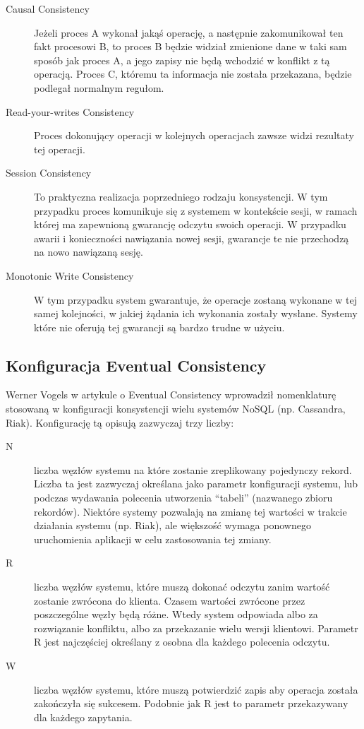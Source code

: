 \begin{description}
 \item[Causal Consistency] 
 Jeżeli proces A wykonał jakąś operację, a następnie zakomunikował ten fakt procesowi B, to proces B będzie widział zmienione dane w taki sam sposób jak proces A, a jego zapisy nie będą wchodzić w konflikt z tą operacją.
 Proces C, któremu ta informacja nie została przekazana, będzie podlegał normalnym regułom.
 \item[Read-your-writes Consistency]
 Proces dokonujący operacji w kolejnych operacjach zawsze widzi rezultaty tej operacji.
 \item[Session Consistency]
 To praktyczna realizacja poprzedniego rodzaju konsystencji.
 W tym przypadku proces komunikuje się z systemem w kontekście sesji, w ramach której ma zapewnioną gwarancję odczytu swoich operacji.
 W przypadku awarii i konieczności nawiązania nowej sesji, gwarancje te nie przechodzą na nowo nawiązaną sesję.
 \item[Monotonic Write Consistency]
 W tym przypadku system gwarantuje, że operacje zostaną wykonane w tej samej kolejności, w jakiej żądania ich wykonania zostały wysłane.
 Systemy które nie oferują tej gwarancji są bardzo trudne w użyciu.
\end{description}

\subsection*{Konfiguracja Eventual Consistency}

Werner Vogels w artykule o Eventual Consistency \cite{vogels-eventually-consistent} wprowadził nomenklaturę stosowaną w konfiguracji konsystencji wielu systemów NoSQL (np. Cassandra, Riak).
Konfigurację tą opisują zazwyczaj trzy liczby:

\begin{description}
 \item[N] liczba węzłów systemu na które zostanie zreplikowany pojedynczy rekord.
 Liczba ta jest zazwyczaj określana jako parametr konfiguracji systemu, lub podczas wydawania polecenia utworzenia ``tabeli'' (nazwanego zbioru rekordów).
 Niektóre systemy pozwalają na zmianę tej wartości w trakcie działania systemu (np. Riak), ale większość wymaga ponownego uruchomienia aplikacji w celu zastosowania tej zmiany.
 \item[R] liczba węzłów systemu, które muszą dokonać odczytu zanim wartość zostanie zwrócona do klienta.
 Czasem wartości zwrócone przez poszczególne węzły będą różne.
 Wtedy system  odpowiada albo za rozwiązanie konfliktu, albo za przekazanie wielu wersji klientowi.
 Parametr R jest najczęściej określany z osobna dla każdego polecenia odczytu.
 \item[W] liczba węzłów systemu, które muszą potwierdzić zapis aby operacja została zakończyła się sukcesem.
 Podobnie jak R jest to parametr przekazywany dla każdego zapytania.
\end{description}


